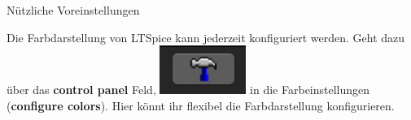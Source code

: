 \documentclass{beamer}
\begin{document}
\begin{frame}[fragile]{Nützliche Voreinstellungen}	

Die Farbdarstellung von LTSpice kann jederzeit konfiguriert werden. Geht dazu über das 
\textbf{control panel} Feld, \includegraphics[scale=0.5]{pictures/controlpanel.png} in die Farbeinstellungen
(\textbf{configure colors}). Hier könnt ihr flexibel die Farbdarstellung konfigurieren.

\begin{figure}
  \centering
  \qquad    
\end{figure}

\end{frame}
\end{document}
